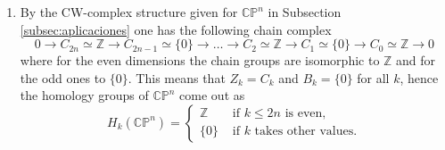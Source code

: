 \begin{example}
\begin{enumerate}[label=(\roman*)]
        Both $1$-cells are attached to the $0$-skeleton at $e^0$; both are loops, hence
        \begin{equation*}
            \partial_1(e^1_1) = \partial_1(e^1_2) = e^0 - e^0 = 0.
        \end{equation*}
        Whereby $Z_1(T^2)=C_1(T^2)\simeq \mathbb{Z}^2$. In this way, one has
        \begin{equation*}
            H_2(T^2)=Z_2/B_2 = \mathbb{Z}/\{0\} = \mathbb{Z} ~\text{ and }~ H_1(T^2)=Z_1/B_1= \mathbb{Z}^2/\{0\} = \mathbb{Z}^2.
        \end{equation*}

        And $H_0(T^2)\simeq \mathbb{Z}$ since it is path-connected.
        \item By the CW-complex structure given for $\mathbb{CP}^n$ in Subsection \ref{subsec:aplicaciones} one has the following chain complex
        \begin{equation*}
            0\to C_{2n}\simeq \mathbb{Z} \to C_{2n-1}\simeq \{0\}\to \dots \to C_{2}\simeq \mathbb{Z} \to C_1\simeq \{0\}\to C_0 \simeq \mathbb{Z}\to 0
        \end{equation*}
        where for the even dimensions the chain groups are isomorphic to $\mathbb{Z}$ and for the odd ones to $\{0\}$. This means that $Z_k = C_k$ and $B_k = \{0\}$ for all $k$, hence the homology groups of $\mathbb{CP}^n$ come out as
        \begin{equation*}
            H_k(\mathbb{CP}^n) =
            \begin{cases}
                \mathbb{Z} &\text{ if } k\le 2n \text{ is even},\\
                \{0\} &\text{ if } k \text{ takes other values}.
            \end{cases}
        \end{equation*}
    \end{enumerate}
\end{example}

\bigskip

